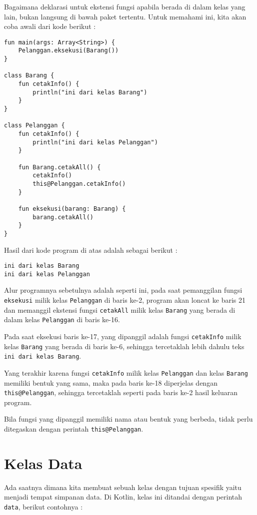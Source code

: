 Bagaimana deklarasi untuk ekstensi fungsi apabila berada di dalam kelas yang lain, bukan langsung di bawah paket tertentu. Untuk memahami ini, kita akan coba awali dari kode berikut :

\begin{lstlisting}
fun main(args: Array<String>) {
	Pelanggan.eksekusi(Barang())
}

class Barang {
	fun cetakInfo() {
		println("ini dari kelas Barang")
	}
}

class Pelanggan {
	fun cetakInfo() {
		println("ini dari kelas Pelanggan")
	}
	
	fun Barang.cetakAll() {
		cetakInfo()
		this@Pelanggan.cetakInfo()
	}
	
	fun eksekusi(barang: Barang) {
		barang.cetakAll()
	}
}
\end{lstlisting}

Hasil dari kode program di atas adalah sebagai berikut :

\begin{lstlisting}
ini dari kelas Barang
ini dari kelas Pelanggan
\end{lstlisting}

Alur programnya sebetulnya adalah seperti ini, pada saat pemanggilan fungsi \texttt{eksekusi} milik kelas \texttt{Pelanggan} di baris ke-2, program akan loncat ke baris 21 dan memanggil ekstensi fungsi \texttt{cetakAll} milik kelas \texttt{Barang} yang berada di dalam kelas \texttt{Pelanggan} di baris ke-16.

Pada saat eksekusi baris ke-17, yang dipanggil adalah fungsi \texttt{cetakInfo} milik kelas \texttt{Barang} yang berada di baris ke-6, sehingga tercetaklah lebih dahulu teks \texttt{ini dari kelas Barang}.

Yang terakhir karena fungsi \texttt{cetakInfo} milik kelas \texttt{Pelanggan} dan kelas \texttt{Barang} memiliki bentuk yang sama, maka pada baris ke-18 diperjelas dengan \texttt{this@Pelanggan}, sehingga tercetaklah seperti pada baris ke-2 hasil keluaran program.

Bila fungsi yang dipanggil memiliki nama atau bentuk yang berbeda, tidak perlu ditegaskan dengan perintah \texttt{this@Pelanggan}.

\section{Kelas Data}

Ada saatnya dimana kita membuat sebuah kelas dengan tujuan spesifik yaitu menjadi tempat simpanan data. Di Kotlin, kelas ini ditandai dengan perintah \texttt{data}, berikut contohnya :

